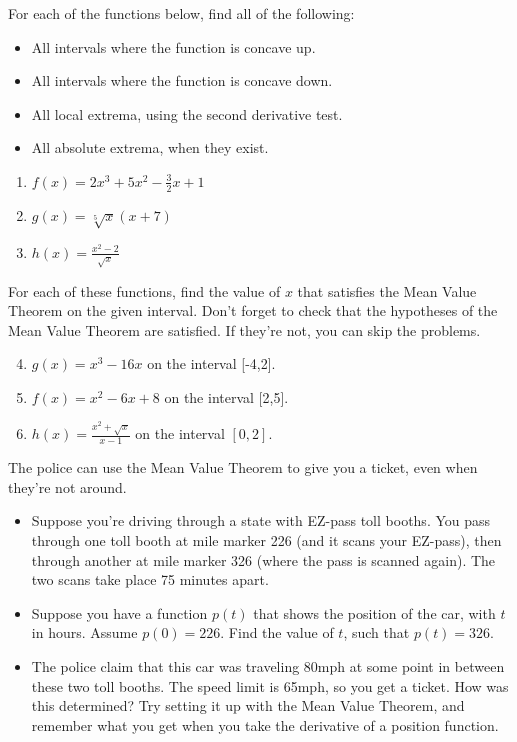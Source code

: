 \documentclass{article}
\begin{document}
For each of the functions below, find all of the following:
\begin{itemize}
\item All intervals where the function is concave up.
\item All intervals where the function is concave down.
\item All local extrema, using the second derivative test.
\item All absolute extrema, when they exist.
\end{itemize}
\begin{enumerate}
\item $f(x) = 2x^3 + 5x^2 - \frac{3}{2}x + 1$
\item $g(x) = \sqrt[5]{x}(x+7)$
\item $h(x) = \frac{x^2 -2}{\sqrt{x}}$
\end{enumerate}

For each of these functions, find the value of $x$ that satisfies the Mean Value Theorem on the given interval. Don't forget to check that the hypotheses of the Mean Value Theorem are satisfied. If they're not, you can skip the problems.

\begin{enumerate}
\setcounter{enumi}{3}
\item $g(x) = x^3 - 16x$ on the interval [-4,2].
\item $f(x) = x^2 - 6x + 8$ on the interval [2,5].
\item $h(x) = \frac{x^2 + \sqrt{x}}{x-1}$ on the interval $[0,2]$.
\end{enumerate}
The police can use the Mean Value Theorem to give you a ticket, even when they're not around.
\begin{itemize}
\item Suppose you're driving through a state with EZ-pass toll booths. You pass through one toll booth at mile marker 226 (and it scans your EZ-pass), then through another at mile marker 326 (where the pass is scanned again). The two scans take place 75 minutes apart.
\item Suppose you have a function $p(t)$ that shows the position of the car, with $t$ in hours. Assume $p(0) = 226$. Find the value of $t$, such that $p(t) = 326$.
\item The police claim that this car was traveling 80mph at some point in between these two toll booths. The speed limit is 65mph, so you get a ticket. How was this determined? Try setting it up with the Mean Value Theorem, and remember what you get when you take the derivative of a position function.
\end{itemize}
\end{document}
